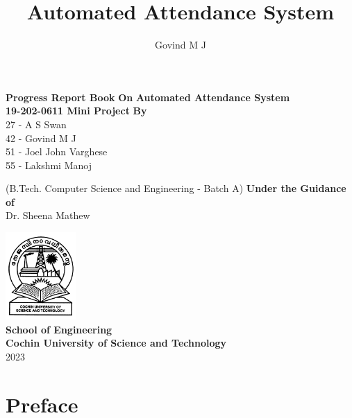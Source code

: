 \documentclass[12pt]{book}
\title{Automated Attendance System}
\author{Govind M J}
\begin{document}
	\pagestyle{plain}
    \setlength\columnsep{20pt}
    \setlength{\columnseprule}{1pt}
	\centering
    \huge
    \thispagestyle{empty}
    \textbf{Progress Report Book} \vfill
    \large
    \textbf{On} \vfill
    \huge
    \textbf{Automated Attendance System}
    \LARGE \\[10pt]
    \textbf{19-202-0611 Mini Project} \vfill
    \vfill
    \large
    \textbf{By} \\ [6pt]
    \Large
   	27 - A S Swan \\
    42 - Govind M J \\
    51 - Joel John Varghese \\
    55 - Lakshmi Manoj \vfill
    
    \Large
    (B.Tech. Computer Science and Engineering - Batch A) \vfill
    \textbf{Under the Guidance of} \\[6pt]
    Dr. Sheena Mathew \vfill
    

    \vfill
    
    \includegraphics[width=0.20\textwidth]{./logo.png}\\[0.5cm]
    \textbf{School of Engineering\\ Cochin University of Science and Technology} \\
    [10pt]
    2023 \\
    
    \chapter*{Preface}
    \normalsize
    \paragraph{}
    
\end{document}
